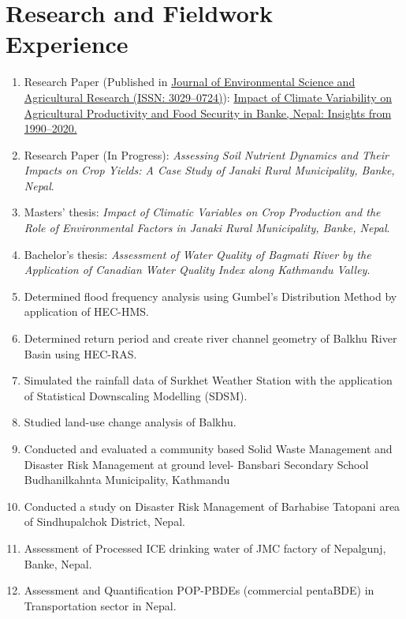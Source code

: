 \documentclass[a4paper,11.5pt]{article}
\begin{document}
\section{Research and Fieldwork Experience}
\begin{enumerate}
    \item Research Paper (Published in \href{https://oaskpublishers.com/journal-of-environmental-science-and-agricultural-research-jesar-home}{Journal of Environmental Science and Agricultural Research (ISSN: 3029--0724)}): \href{https://oaskpublishers.com/assets/article-pdf/impact-of-climate-variability-on-agricultural-productivity-and-food-security--in-banke-nepal-insights-from-1990-2020.pdf}{Impact of Climate Variability on Agricultural Productivity and Food Security in Banke, Nepal: Insights from 1990--2020.}
    \item Research Paper (In Progress): \textit{Assessing Soil Nutrient Dynamics and Their Impacts on Crop Yields: A Case Study of Janaki Rural Municipality, Banke, Nepal}.
    \item Masters’ thesis: \textit{Impact of Climatic Variables on Crop Production and the Role of Environmental Factors in Janaki Rural Municipality, Banke, Nepal}.
    \item Bachelor's thesis: \textit{Assessment of Water Quality of Bagmati River by the Application of Canadian Water Quality Index along Kathmandu Valley}.
    \item Determined flood frequency analysis using Gumbel’s Distribution Method by application of HEC-HMS.
    \item Determined return period and create river channel geometry of Balkhu River Basin using HEC-RAS.
    \item Simulated the rainfall data of Surkhet Weather Station with the application of Statistical Downscaling Modelling (SDSM).
    \item Studied land-use change analysis of Balkhu.
    \item Conducted and evaluated a community based Solid Waste Management and Disaster Risk Management at ground level- Bansbari Secondary School Budhanilkahnta Municipality, Kathmandu
    \item Conducted a study on Disaster Risk Management of Barhabise Tatopani area of Sindhupalchok District, Nepal.
    \item Assessment of Processed ICE drinking water of JMC factory
    of Nepalgunj, Banke, Nepal.
    \item Assessment and Quantification POP-PBDEs (commercial pentaBDE) in Transportation sector in Nepal.

\end{enumerate}
\end{document}
